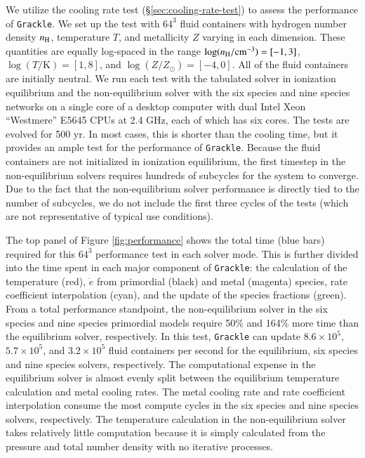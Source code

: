 We utilize the cooling rate test (\S\ref{sec:cooling-rate-test}) to
assess the performance of \texttt{Grackle}.  We set up the test with $64^3$
fluid containers with hydrogen number density $n_{\rm H}$, temperature
$T$, and metallicity $Z$ varying in each dimension.  These quantities
are equally log-spaced in the range $\log (n_{\rm H} /
\textrm{cm}^{-3}) = [-1, 3]$, $\log (T/\textrm{K}) = [1, 8]$, and
$\log (Z/Z_\odot) = [-4, 0]$.  All of the fluid containers are
initially neutral.  We run each test with the tabulated solver in
ionization equilibrium and the non-equilibrium solver with the
six species and nine species networks on a single core of a desktop
computer with dual Intel Xeon ``Westmere'' E5645 CPUs at 2.4 GHz, each
of which has six cores.  The tests are evolved for 500 yr. In
most cases, this is shorter than the cooling time, but it provides an
ample test for the performance of \texttt{Grackle}.  Because the fluid
containers are not initialized in ionization equilibrium, the first
timestep in the non-equilibrium solvers requires hundreds of subcycles
for the system to converge.  Due to the fact that the non-equilibrium solver
performance is directly tied to the number of subcycles, we do not
include the first three cycles of the tests (which are not representative of
typical use conditions).


The top panel of Figure \ref{fig:performance} shows the total time
(blue bars) required for this $64^3$ performance test in each solver
mode.  This is further divided into the time spent in each major
component of \texttt{Grackle}: the calculation of the temperature (red),
$\dot{e}$ from primordial (black) and metal (magenta) species, rate
coefficient interpolation (cyan), and the update of the species
fractions (green).  From a total performance standpoint, the
non-equilibrium solver in the six species and nine species primordial
models require 50\% and 164\% more time than the equilibrium solver,
respectively.  In this test, \texttt{Grackle} can update $8.6 \times 10^5$,
$5.7 \times 10^5$, and $3.2 \times 10^5$ fluid containers per second
for the equilibrium, six species and nine species solvers, respectively.
The computational expense in the equilibrium solver is almost evenly
split between the equilibrium temperature calculation and metal
cooling rates.  The metal cooling rate and rate coefficient
interpolation consume the most compute cycles in the six species and
nine species solvers, respectively.  The temperature calculation in the
non-equilibrium solver takes relatively little computation because it
is simply calculated from the pressure and total number density with
no iterative processes.

